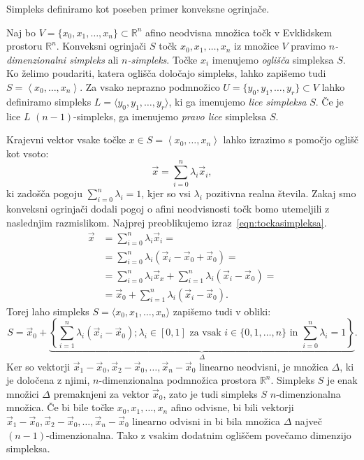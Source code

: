 \documentclass[mat1]{fmfdelo}
\newcommand{\R}{\mathbb R}
\newcommand{\0}{\underline{0}}
\begin{document}
Simpleks definiramo kot poseben primer konveksne ogrinjače.
\begin{definicija}
Naj bo $V = \{x_0, x_1, \dots , x_n \} \subset \R^n$ afino neodvisna množica točk v Evklidskem prostoru $\R^n$. Konveksni ogrinjači $S$ točk $x_0, x_1, \dots , x_n$ iz množice $V$ pravimo \emph{$n$-dimenzionalni simpleks} ali \emph{$n$-simpleks}. Točke $x_i$ imenujemo \emph{oglišča} simpleksa $S$. Ko želimo poudariti, katera oglišča določajo simpleks, lahko zapišemo tudi $S = \left < x_0, \dots, x_n \right >$. Za vsako neprazno podmnožico $U = \{ y_0, y_1, \dots, y_r \} \subset V$ lahko definiramo simpleks $L = \langle y_0, y_1, \dots, y_r \rangle$, ki ga imenujemo \emph{lice simpleksa} $S$. Če je lice $L$ $(n-1)$-simpleks, ga imenujemo \emph{pravo lice} simpleksa $S$. 
\end{definicija}
 Krajevni vektor vsake točke $x \in S = \left < x_0, \dots, x_n \right >$ lahko izrazimo s pomočjo oglišč kot vsoto:
\begin{equation}\label{eqn:tockasimpleksa}
\vec{x} = \sum\limits_{i=0}^n \lambda_i \vec{x}_i,
\end{equation}
ki zadošča pogoju $\sum\limits_{i=0}^n \lambda_i = 1$, kjer so vsi $\lambda_i$ pozitivna realna števila. Zakaj smo konveksni ogrinjači dodali pogoj o afini neodvisnosti točk bomo utemeljili z naslednjim razmislikom. Najprej preoblikujemo izraz~\eqref{eqn:tockasimpleksa}. 
\begin{align*}
\vec{x} &= \sum\limits_{i=0}^n \lambda_i \vec{x}_i =\\
&= \sum\limits_{i=0}^n \lambda_i (\vec{x}_i - \vec{x}_0 + \vec{x}_0) =\\
&= \sum\limits_{i=0}^n \lambda_i \vec{x}_x + \sum\limits_{i=1}^n \lambda_i (\vec{x}_i - \vec{x}_0) =\\
&= \vec{x}_0 + \sum\limits_{i=1}^n \lambda_i (\vec{x}_i - \vec{x}_0).
\end{align*}
Torej laho simpleks $S = \langle x_0, x_1, \dots, x_n \rangle$ zapišemo tudi v obliki:
$$S = \vec{x}_0 + \underbrace{\left \{ \sum\limits_{i=1}^n \lambda_i (\vec{x}_i - \vec{x}_0); \lambda_i \in [0, 1] \text{ za vsak } i \in \{0, 1, \dots, n \} \text{ in } \sum\limits_{i=0}^n \lambda_i = 1  \right \}}_{\Delta}.$$
Ker so vektorji $\vec{x}_1 - \vec{x}_0, \vec{x}_2 - \vec{x}_0, \dots, \vec{x}_n - \vec{x}_0$ linearno neodvisni, je množica $\Delta$, ki je določena z njimi, $n$-dimenzionalna podmnožica prostora $\R^n$. Simpleks $S$ je enak množici $\Delta$ premaknjeni za vektor $\vec{x}_0$, zato je tudi simpleks $S$ $n$-dimenzionalna množica. Če bi bile točke $x_0, x_1, \dots, x_n$ afino odvisne, bi bili vektorji $\vec{x}_1 - \vec{x}_0, \vec{x}_2 - \vec{x}_0, \dots, \vec{x}_n - \vec{x}_0$ linearno odvisni in bi bila množica $\Delta$ največ $(n-1)$-dimenzionalna. Tako z vsakim dodatnim ogliščem povečamo dimenzijo simpleksa.
\end{document}
